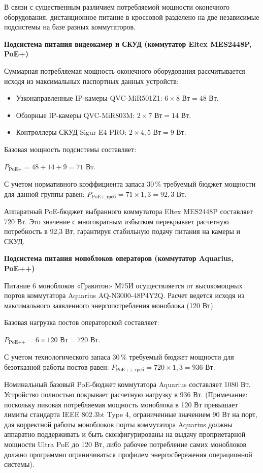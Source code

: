 \documentclass[a4paper,oneside,14pt]{extreport}
\begin{document}
В связи с существенным различием потребляемой мощности оконечного оборудования, дистанционное питание в кроссовой разделено на две независимые подсистемы на базе разных коммутаторов.

\textbf{Подсистема питания видеокамер и СКУД (коммутатор Eltex MES2448P, PoE+)}

Суммарная потребляемая мощность оконечного оборудования рассчитывается исходя из максимальных паспортных данных устройств:

\begin{itemize}
    \item Узконаправленные IP-камеры QVC-MiR501Z1: $6 \times 8 \text{ Вт} = 48 \text{ Вт}$.
    \item Обзорные IP-камеры QVC-MiR803M: $2 \times 7 \text{ Вт} = 14 \text{ Вт}$.
    \item Контроллеры СКУД Sigur E4 PRO: $2 \times 4{,}5 \text{ Вт} = 9 \text{ Вт}$.
\end{itemize}
Базовая мощность подсистемы составляет:

$P_{\text{PoE+}} = 48 + 14 + 9 = 71 \text{ Вт}$.

С учетом нормативного коэффициента запаса 30\,\% требуемый бюджет мощности для данной группы равен: $P_{\text{PoE+\_треб}} = 71 \times 1{,}3 = 92{,}3 \text{ Вт}$. 

Аппаратный PoE-бюджет выбранного коммутатора Eltex MES2448P составляет 720 Вт. Это значение с многократным избытком перекрывает расчетную потребность в 92,3 Вт, гарантируя стабильную подачу питания на камеры и СКУД.

\textbf{Подсистема питания моноблоков операторов (коммутатор Aquarius, PoE++)}

Питание 6 моноблоков «Гравитон» М75И осуществляется от высокомощных портов коммутатора Aquarius AQ-N3000-48P4Y2Q. Расчет ведется исходя из максимального заявленного энергопотребления моноблока (120 Вт).

Базовая нагрузка постов операторской составляет:

$P_{\text{PoE++}} = 6 \times 120 \text{ Вт} = 720 \text{ Вт}$.

С учетом технологического запаса 30\,\% требуемый бюджет мощности для безотказной работы постов равен: $P_{\text{PoE++\_треб}} = 720 \times 1{,}3 = 936 \text{ Вт}$. 

Номинальный базовый PoE-бюджет коммутатора Aquarius составляет 1080 Вт. Устройство полностью покрывает расчетную нагрузку в 936 Вт. (Примечание: поскольку пиковая потребляемая мощность моноблока в 120 Вт превышает лимиты стандарта IEEE 802.3bt Type 4, ограниченные значением 90 Вт на порт, для корректной работы моноблоков порты коммутатора Aquarius должны аппаратно поддерживать и быть сконфигурированы на выдачу проприетарной мощности Ultra PoE до 120 Вт, либо рабочее потребление самих моноблоков должно программно ограничиваться профилем энергосбережения операционной системы).
\end{document}
